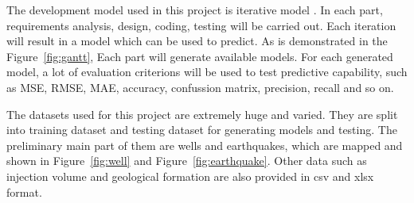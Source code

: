 \documentclass[project-plan]{report-template}
\begin{document}
The development model used in this project is iterative model \citep{alshamrani2015comparison}. In each part, requirements analysis, design, coding, testing will be carried out.
Each iteration will result in a model which can be used to predict. As is demonstrated in the Figure~\ref{fig:gantt}, Each part will generate available models.
For each generated model, a lot of evaluation criterions will be used to test predictive capability, such as MSE, RMSE, MAE, accuracy, confussion matrix, precision, recall and so on. 

The datasets used for this project are extremely huge and varied. They are split into training dataset and testing dataset for generating models and testing.
The preliminary main part of them are wells and earthquakes, which are mapped and shown in Figure~\ref{fig:well} and Figure~\ref{fig:earthquake}. 
Other data such as injection volume and geological formation are also provided in csv and xlsx format.

\end{document}
